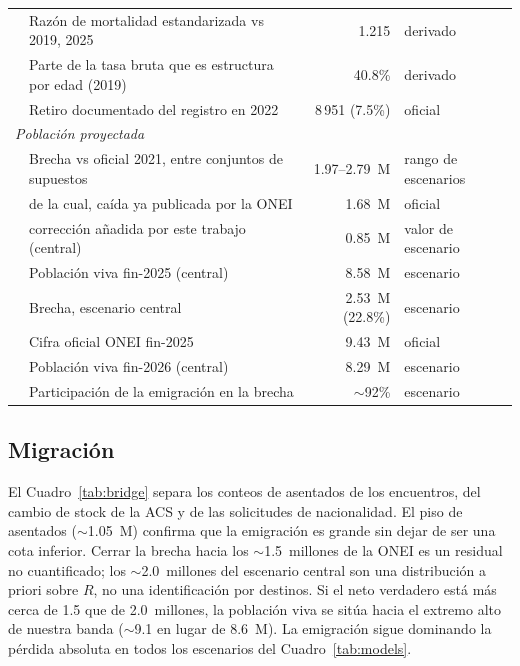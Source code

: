 \documentclass[11pt,a4paper]{article}
\begin{document}
\begin{table}[ht]
\begin{tabular}{llrl}
& Razón de mortalidad estandarizada vs 2019, 2025 & 1.215 & derivado \\
& Parte de la tasa bruta que es estructura por edad (2019) & 40.8\% & derivado \\
& Retiro documentado del registro en 2022 & 8\,951 (7.5\%) & oficial \\
\midrule
\multicolumn{4}{l}{\textit{Población proyectada}} \\
& Brecha vs oficial 2021, entre conjuntos de supuestos & 1.97--2.79~M & rango de escenarios \\
& \quad de la cual, caída ya publicada por la ONEI & 1.68~M & oficial \\
& \quad corrección añadida por este trabajo (central) & 0.85~M & valor de escenario \\
& Población viva fin-2025 (central) & 8.58~M & escenario \\
& Brecha, escenario central & 2.53~M (22.8\%) & escenario \\
& Cifra oficial ONEI fin-2025 & 9.43~M & oficial \\
& Población viva fin-2026 (central) & 8.29~M & escenario \\
& Participación de la emigración en la brecha & $\sim$92\% & escenario \\
\bottomrule
\end{tabular}
\end{table}

\subsection{Migración}


El Cuadro~\ref{tab:bridge} separa los conteos de asentados de los encuentros, del cambio de stock de la ACS y de las solicitudes de nacionalidad.
El piso de asentados ($\sim$1.05~M) confirma que la emigración es grande sin dejar de ser una cota inferior.
Cerrar la brecha hacia los $\sim$1.5~millones de la ONEI es un residual no cuantificado; los $\sim$2.0~millones del escenario central son una distribución a priori sobre $R$, no una identificación por destinos.
Si el neto verdadero está más cerca de 1.5 que de 2.0~millones, la población viva se sitúa hacia el extremo alto de nuestra banda ($\sim$9.1 en lugar de 8.6~M).
La emigración sigue dominando la pérdida absoluta en todos los escenarios del Cuadro~\ref{tab:models}.
\end{document}
